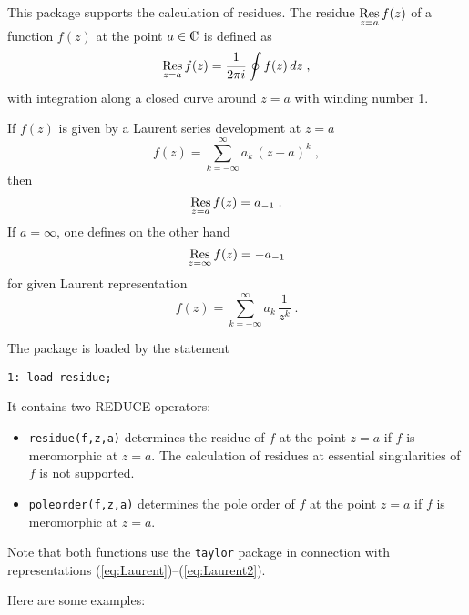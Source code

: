 
\def\Res{\mathop{\rm Res}\limits}
\newcommand{\C}{{\rm {\mbox{C{\llap{{\vrule height1.52ex}\kern.4em}}}}}}

This package supports the calculation of residues. The residue
$\Res_{z=a} f(z)$ of a function $f(z)$ at the point $a\in\C$ is defined
as
\[
\Res_{z=a} f(z)=
\frac{1}{2 \pi i}\oint f(z)\,dz
\;,
\]
with integration along a closed curve around $z=a$ with winding number 1.

If $f(z)$ is given by a Laurent series development at $z=a$
\[
f(z)=\sum_{k=-\infty}^\infty a_k\,(z-a)^k
\;,
\]
then
\begin{equation}
\Res\limits_{z=a} f(z)=a_{-1}
\;.
\label{eq:Laurent}
\end{equation}
If $a=\infty$, one defines on the other hand
\begin{equation}
\Res\limits_{z=\infty} f(z)=-a_{-1}
\label{eq:Laurent2}
\end{equation}
for given Laurent representation
\[
f(z)=\sum_{k=-\infty}^\infty a_k\,\frac{1}{z^k}
\;.
\]

The package is loaded by the statement

\begin{verbatim}
1: load residue;
\end{verbatim}

It contains two REDUCE operators:

\begin{itemize}
\item
{\tt residue(f,z,a)} determines the residue of $f$ at the point $z=a$
if $f$ is meromorphic at $z=a$. The calculation of residues at essential
singularities of $f$ is not supported.
\item
{\tt poleorder(f,z,a)} determines the pole order of $f$ at the point $z=a$
if $f$ is meromorphic at $z=a$.
\end{itemize}
Note that both functions use the {\tt taylor} package in
connection with representations (\ref{eq:Laurent})--(\ref{eq:Laurent2}).

Here are some examples:

